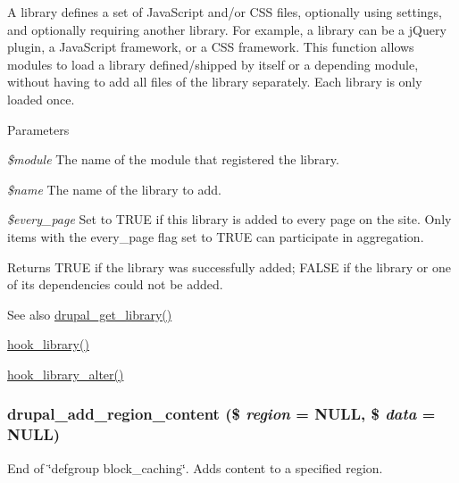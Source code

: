 A library defines a set of JavaScript and/or CSS files, optionally using settings, and optionally requiring another library. For example, a library can be a jQuery plugin, a JavaScript framework, or a CSS framework. This function allows modules to load a library defined/shipped by itself or a depending module, without having to add all files of the library separately. Each library is only loaded once.


\begin{DoxyParams}{Parameters}
\item[{\em \$module}]The name of the module that registered the library. \item[{\em \$name}]The name of the library to add. \item[{\em \$every\_\-page}]Set to TRUE if this library is added to every page on the site. Only items with the every\_\-page flag set to TRUE can participate in aggregation.\end{DoxyParams}
\begin{DoxyReturn}{Returns}
TRUE if the library was successfully added; FALSE if the library or one of its dependencies could not be added.
\end{DoxyReturn}
\begin{DoxySeeAlso}{See also}
\hyperlink{common_8inc_aa535ac5edd443308d3b2812caf1a1b85}{drupal\_\-get\_\-library()} 

\hyperlink{group__hooks_ga6bf3f83fa2e373836f5aa78fd143d1cd}{hook\_\-library()} 

\hyperlink{group__hooks_ga7256c50068666c9c02f43a08efcefae7}{hook\_\-library\_\-alter()} 
\end{DoxySeeAlso}
\hypertarget{common_8inc_a868829276154d107ebf8a692a6ff7efa}{
\subsubsection[{drupal\_\-add\_\-region\_\-content}]{\setlength{\rightskip}{0pt plus 5cm}drupal\_\-add\_\-region\_\-content (\$ {\em region} = {\ttfamily NULL}, \/  \$ {\em data} = {\ttfamily NULL})}}
\label{common_8inc_a868829276154d107ebf8a692a6ff7efa}
End of \char`\"{}defgroup block\_\-caching\char`\"{}. Adds content to a specified region.


